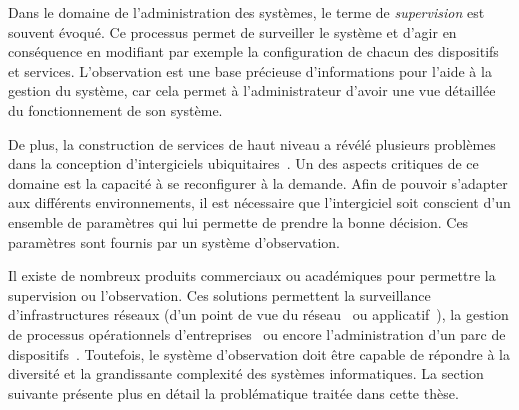 Dans le domaine de l'administration des systèmes, le terme de \textit{supervision} est souvent évoqué. Ce processus permet de surveiller le système et d'agir en conséquence en modifiant par exemple la configuration de chacun des dispositifs et services. L'observation est une base précieuse d'informations pour l'aide à la gestion du système, car cela permet à l'administrateur d'avoir une vue détaillée du fonctionnement de son système.

De plus, la construction de services de haut niveau a révélé plusieurs problèmes dans la conception d'intergiciels ubiquitaires~\cite{Geihs:challenges}. Un des aspects critiques de ce domaine est la capacité à se reconfigurer à la demande. Afin de pouvoir s'adapter aux différents environnements, il est nécessaire que l'intergiciel soit conscient d'un ensemble de paramètres qui lui permette de prendre la bonne décision. Ces paramètres sont fournis par un système d'observation.

Il existe de nombreux produits commerciaux ou académiques pour permettre la supervision ou l'observation. Ces solutions permettent la surveillance d'infrastructures réseaux (d'un point de vue du réseau~\cite{url:zabbix} ou applicatif~\cite{url:manageengine}), la gestion de processus opérationnels d'entreprises~\cite{url:systar} ou encore l'administration d'un parc de dispositifs~\cite{IETF:SNMP}. Toutefois, le système d'observation doit être capable de répondre à la diversité et la grandissante complexité des systèmes informatiques. La section suivante présente plus en détail la problématique traitée dans cette thèse.

